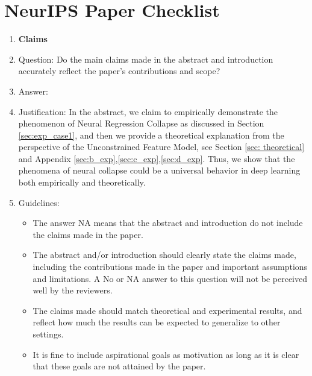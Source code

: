 \documentclass{article}
\theoremstyle{plain}
\theoremstyle{definition}
\theoremstyle{remark}
\begin{document}
\newpage
\section*{NeurIPS Paper Checklist}


\begin{enumerate}

\item {\bf Claims}
    \item[] Question: Do the main claims made in the abstract and introduction accurately reflect the paper's contributions and scope?
    \item[] Answer: \answerYes{} %
    \item[] Justification: In the abstract, we claim to empirically demonstrate the phenomenon of Neural Regression Collapse as discussed in Section \ref{sec:exp_case1}, and then we provide a theoretical explanation from the perspective of the Unconstrained Feature Model, see Section \ref{sec: theoretical} and Appendix \ref{sec:b_exp},\ref{sec:c_exp},\ref{sec:d_exp}. Thus, we show that the phenomena of neural collapse could be a universal behavior in deep learning both empirically and theoretically.

    \item[] Guidelines:
    \begin{itemize}
        \item The answer NA means that the abstract and introduction do not include the claims made in the paper.
        \item The abstract and/or introduction should clearly state the claims made, including the contributions made in the paper and important assumptions and limitations. A No or NA answer to this question will not be perceived well by the reviewers. 
        \item The claims made should match theoretical and experimental results, and reflect how much the results can be expected to generalize to other settings. 
        \item It is fine to include aspirational goals as motivation as long as it is clear that these goals are not attained by the paper. 
    \end{itemize}


\end{enumerate}
\end{document}
